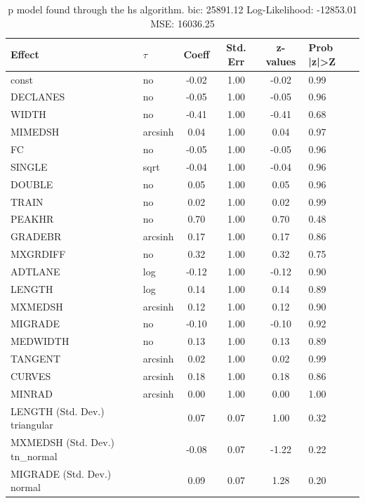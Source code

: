 \begin{table}
	\caption{p model found through the hs algorithm. bic: 25891.12 Log-Likelihood: -12853.01 MSE: 16036.25}
	\begin{center}
		\begin{tabular}{|l|l|c|c|c|l|}
			\hline
			Effect & $\tau$ & Coeff & Std. Err & z-values & Prob |z|>Z \\
			\hline
			const & no & -0.02 & 1.00 & -0.02 & 0.99 \\
			\hline
			DECLANES & no & -0.05 & 1.00 & -0.05 & 0.96 \\
			\hline
			WIDTH & no & -0.41 & 1.00 & -0.41 & 0.68 \\
			\hline
			MIMEDSH & arcsinh & 0.04 & 1.00 & 0.04 & 0.97 \\
			\hline
			FC & no & -0.05 & 1.00 & -0.05 & 0.96 \\
			\hline
			SINGLE & sqrt & -0.04 & 1.00 & -0.04 & 0.96 \\
			\hline
			DOUBLE & no & 0.05 & 1.00 & 0.05 & 0.96 \\
			\hline
			TRAIN & no & 0.02 & 1.00 & 0.02 & 0.99 \\
			\hline
			PEAKHR & no & 0.70 & 1.00 & 0.70 & 0.48 \\
			\hline
			GRADEBR & arcsinh & 0.17 & 1.00 & 0.17 & 0.86 \\
			\hline
			MXGRDIFF & no & 0.32 & 1.00 & 0.32 & 0.75 \\
			\hline
			ADTLANE & log & -0.12 & 1.00 & -0.12 & 0.90 \\
			\hline
			LENGTH & log & 0.14 & 1.00 & 0.14 & 0.89 \\
			\hline
			MXMEDSH & arcsinh & 0.12 & 1.00 & 0.12 & 0.90 \\
			\hline
			MIGRADE & no & -0.10 & 1.00 & -0.10 & 0.92 \\
			\hline
			MEDWIDTH & no & 0.13 & 1.00 & 0.13 & 0.89 \\
			\hline
			TANGENT & arcsinh & 0.02 & 1.00 & 0.02 & 0.99 \\
			\hline
			CURVES & arcsinh & 0.18 & 1.00 & 0.18 & 0.86 \\
			\hline
			MINRAD & arcsinh & 0.00 & 1.00 & 0.00 & 1.00 \\
			\hline
			LENGTH (Std. Dev.) triangular &  & 0.07 & 0.07 & 1.00 & 0.32 \\
			\hline
			MXMEDSH (Std. Dev.) tn_normal &  & -0.08 & 0.07 & -1.22 & 0.22 \\
			\hline
			MIGRADE (Std. Dev.) normal &  & 0.09 & 0.07 & 1.28 & 0.20 \\

\end{tabular}
\end{center}
\end{table}
